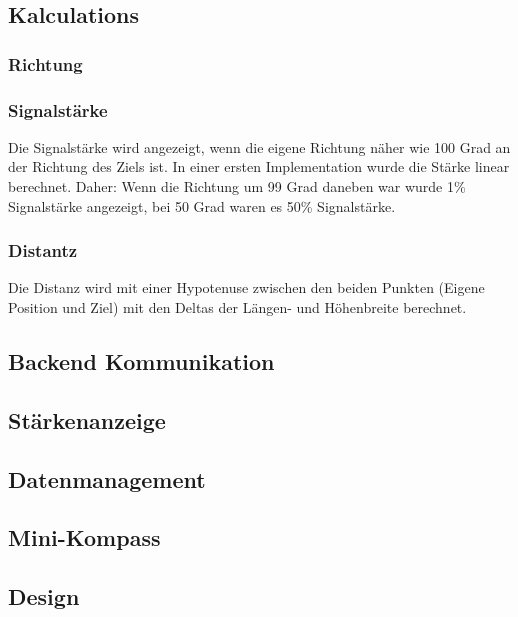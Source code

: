 \subsection{Kalculations} %
\label{sub:kalculations}
\subsubsection{Richtung} %
\label{ssub:richtung}

\subsubsection{Signalstärke} %
\label{ssub:signalstärke}
Die Signalstärke wird angezeigt, wenn die eigene Richtung näher wie 100 Grad an der Richtung des Ziels ist. In einer ersten Implementation wurde die Stärke linear berechnet. Daher: Wenn die Richtung um 99 Grad daneben war wurde 1\% Signalstärke angezeigt, bei 50 Grad waren es 50\% Signalstärke.
\subsubsection{Distantz} %
\label{ssub:distantz}
Die Distanz wird mit einer Hypotenuse zwischen den beiden Punkten (Eigene Position und Ziel) mit den Deltas der Längen- und Höhenbreite berechnet. 

\subsection{Backend Kommunikation} %
\label{sub:backend_kommunikation}


\subsection{Stärkenanzeige} %
\label{sub:stärkenanzeige}


\subsection{Datenmanagement} %
\label{sub:datenmanagement}


\subsection{Mini-Kompass} %
\label{sub:mini_kompass}


\subsection{Design} %
\label{sub:design}


